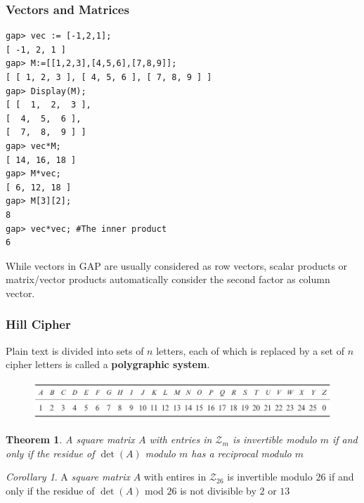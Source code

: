 \documentclass{beamer}
\newtheorem{thm}{Theorem}
\theoremstyle{definition}
\theoremstyle{remark}
\newtheorem*{col}{Corollary}
\begin{document}
\begin{frame}
	\frametitle{Vectors and Matrices}
\begin{verbatim}
gap> vec := [-1,2,1];
[ -1, 2, 1 ]
gap> M:=[[1,2,3],[4,5,6],[7,8,9]];
[ [ 1, 2, 3 ], [ 4, 5, 6 ], [ 7, 8, 9 ] ]
gap> Display(M);
[ [  1,  2,  3 ],
[  4,  5,  6 ],
[  7,  8,  9 ] ]
gap> vec*M;
[ 14, 16, 18 ]
gap> M*vec;
[ 6, 12, 18 ]
gap> M[3][2];
8
gap> vec*vec; #The inner product
6	
\end{verbatim}
	While vectors in GAP are usually considered as row vectors, scalar products or matrix/vector products automatically consider the second factor as column vector.
\end{frame}
\begin{frame}
	\frametitle{Hill Cipher}
	Plain text is divided into sets of $ n $ letters, each of which is replaced by a set of $ n $ cipher letters is called a \textbf{polygraphic system}.

\LogoOff

\begin{figure}
\centering
\includegraphics[width=1.3\linewidth]{HillCipher}
\label{fig:HillCipher}
\end{figure}
\begin{thm}
	A \emph{square matrix} $ A $ with entries in $ \mathcal{Z}_m $ is invertible modulo $ m $ if and only if the residue of $ \operatorname{det}(A) $ modulo $ m $ has a reciprocal modulo $ m $
\end{thm}
\begin{col}
	A \emph{square matrix} $ A $ with entires in $ \mathcal{Z}_{26} $ is invertible modulo $ 26 $ if and only if the residue of $ \operatorname{det}(A) $ mod $ 26 $ is not divisible by $ 2 $ or $ 13 $
\end{col}
\end{frame}
\end{document}
